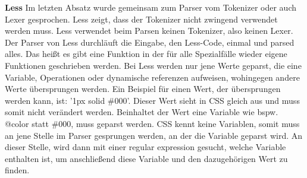 \textbf{Less}\newline
Im letzten Absatz wurde gemeinsam zum Parser vom Tokenizer oder auch Lexer gesprochen. Less zeigt, dass der Tokenizer nicht zwingend verwendet werden muss.
Less verwendet beim Parsen keinen Tokenizer, also keinen Lexer.\newline
Der Parser von Less durchläuft die Eingabe, den Less-Code, einmal und parsed alles. Das heißt es gibt eine Funktion in der für alle Spezialfälle wieder eigene Funktionen geschrieben werden.\newline
Bei Less werden nur jene Werte geparst, die eine Variable, Operationen oder dynamische referenzen aufweisen, wohingegen andere Werte übersprungen werden.\newline
Ein Beispiel für einen Wert, der übersprungen werden kann, ist: '1px solid \#000'.\newline
Dieser Wert sieht in CSS gleich aus und muss somit nicht verändert werden.\newline
Beinhaltet der Wert eine Variable wie bspw. @color statt \#000, muss geparst werden.\newline
CSS kennt keine Variablen, somit muss an jene Stelle im Parser gesprungen werden, an der die Variable geparst wird.\newline
An dieser Stelle, wird dann mit einer regular expression gesucht, welche Variable enthalten ist, um anschließend diese Variable und den dazugehörigen Wert zu finden. 

